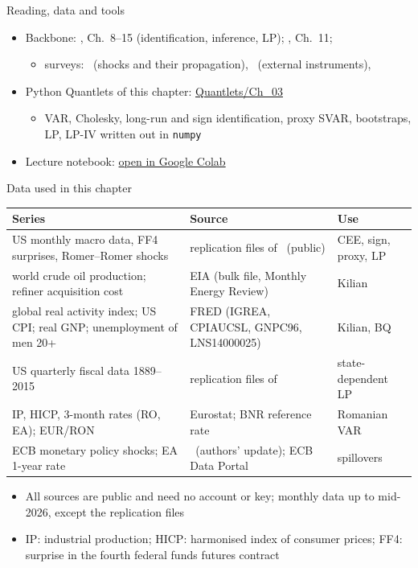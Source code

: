 \begin{frame}{Reading, data and tools}
\itemsize{\small}
\begin{itemize}
    \item Backbone: , Ch.~8--15 (identification, inference, LP); , Ch.~11; 
    \begin{itemize}
        \item surveys: \ (shocks and their propagation), \ (external instruments), 
    \end{itemize}
    \item Python Quantlets of this chapter: \href{https://github.com/danpele/Advanced-Time-Series/tree/main/Quantlets/Ch_03}{Quantlets/Ch\_03}
    \begin{itemize}
        \item VAR, Cholesky, long-run and sign identification, proxy SVAR, bootstraps, LP, LP-IV written out in \texttt{numpy}
    \end{itemize}
    \item Lecture notebook: \href{\colaburl{notebooks/EN/chapter3_lecture_notebook.ipynb}}{open in Google Colab}
\end{itemize}
\end{frame}

\begin{frame}{Data used in this chapter}
\itemsize{\footnotesize}
\begin{center}
\scriptsize
\begin{tabular}{>{\raggedright\arraybackslash}p{4.6cm}>{\raggedright\arraybackslash}p{4.9cm}>{\raggedright\arraybackslash}p{2.4cm}}
\toprule
\textbf{Series} & \textbf{Source} & \textbf{Use} \\
\midrule
US monthly macro data, FF4 surprises, Romer--Romer shocks & replication files of \ (public) & CEE, sign, proxy, LP \\
world crude oil production; refiner acquisition cost & EIA (bulk file, Monthly Energy Review) & Kilian \\
global real activity index; US CPI; real GNP; unemployment of men 20+ & FRED (IGREA, CPIAUCSL, GNPC96, LNS14000025) & Kilian, BQ \\
US quarterly fiscal data 1889--2015 & replication files of {} & state-dependent LP \\
IP, HICP, 3-month rates (RO, EA); EUR/RON & Eurostat; BNR reference rate & Romanian VAR \\
ECB monetary policy shocks; EA 1-year rate & \ (authors' update); ECB Data Portal & spillovers \\
\bottomrule
\end{tabular}
\end{center}
\begin{itemize}
    \item All sources are public and need no account or key; monthly data up to mid-2026, except the replication files
    \item IP: industrial production; HICP: harmonised index of consumer prices; FF4: surprise in the fourth federal funds futures contract
\end{itemize}
\end{frame}

